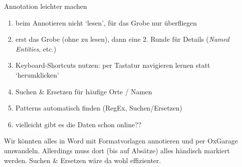 \begin{frame}[allowframebreaks]{Annotation leichter machen}
\footnotesize
\begin{enumerate}
    \item beim Annotieren nicht `lesen', für das Grobe nur überfliegen
    \item erst das Grobe (ohne zu lesen), dann eine 2. Runde für Details (\emph{Named Entities}, etc.)
    \item Keyboard-Shortcuts nutzen: per Tastatur navigieren lernen statt `herumklicken'
    \item Suchen \& Ersetzen für häufige Orte / Namen
    \item Patterns automatisch finden (RegEx, Suchen/Ersetzen)
    \item vielleicht gibt es die Daten schon online??
\end{enumerate}
\smallskip

Wir könnten alles in Word mit Formatvorlagen annotieren und per OxGarage umwandeln. Allerdings muss dort (bis auf Absätze) alles händisch markiert werden. Suchen \& Ersetzen wäre da wohl effizienter.


\end{frame}
